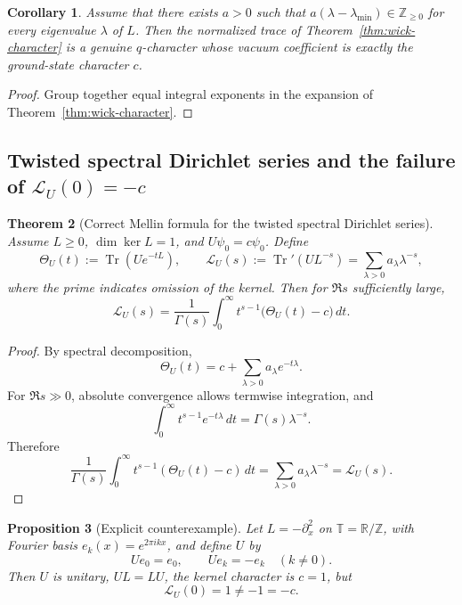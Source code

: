 \documentclass[11pt,a4paper]{article}
\numberwithin{equation}{section}
\newtheorem{theorem}{Theorem}[section]
\newtheorem{proposition}[theorem]{Proposition}
\newtheorem{corollary}[theorem]{Corollary}
\theoremstyle{definition}
\theoremstyle{remark}
\newcommand{\ZZ}{\mathbb Z}
\newcommand{\RR}{\mathbb R}
\begin{document}
\begin{corollary}\label{cor:genuine-q-character}
Assume that there exists $a>0$ such that $a(\lambda-\lambda_{\min})\in\ZZ_{\ge 0}$ for every eigenvalue $\lambda$ of $L$.  Then the normalized trace of Theorem~\ref{thm:wick-character} is a genuine $q$-character whose vacuum coefficient is exactly the ground-state character $c$.
\end{corollary}

\begin{proof}
Group together equal integral exponents in the expansion of Theorem~\ref{thm:wick-character}.
\end{proof}

\subsection{Twisted spectral Dirichlet series and the failure of $\mathcal L_U(0)=-c$}

\begin{theorem}[Correct Mellin formula for the twisted spectral Dirichlet series]\label{thm:twisted-mellin}
Assume $L\ge 0$, $\dim\ker L=1$, and $U\psi_0=c\psi_0$.  Define
\[
\Theta_U(t):=\operatorname{Tr}(Ue^{-tL}),
\qquad
\mathcal L_U(s):=\operatorname{Tr}'(UL^{-s})=\sum_{\lambda>0} a_\lambda\lambda^{-s},
\]
where the prime indicates omission of the kernel.  Then for $\Re s$ sufficiently large,
\[
\mathcal L_U(s)=\frac{1}{\Gamma(s)}\int_0^\infty t^{s-1}\bigl(\Theta_U(t)-c\bigr)\,dt.
\]
\end{theorem}

\begin{proof}
By spectral decomposition,
\[
\Theta_U(t)=c+\sum_{\lambda>0} a_\lambda e^{-t\lambda}.
\]
For $\Re s\gg 0$, absolute convergence allows termwise integration, and
\[
\int_0^\infty t^{s-1}e^{-t\lambda}\,dt=\Gamma(s)\lambda^{-s}.
\]
Therefore
\[
\frac{1}{\Gamma(s)}\int_0^\infty t^{s-1}(\Theta_U(t)-c)\,dt
=\sum_{\lambda>0} a_\lambda\lambda^{-s}
=\mathcal L_U(s).
\]
\end{proof}

\begin{proposition}[Explicit counterexample]\label{prop:counterexample-L0}
Let $L=-\partial_x^2$ on $\mathbb T=\RR/\ZZ$, with Fourier basis $e_k(x)=e^{2\pi ikx}$, and define $U$ by
\[
Ue_0=e_0,
\qquad
Ue_k=-e_k\quad (k\ne 0).
\]
Then $U$ is unitary, $UL=LU$, the kernel character is $c=1$, but
\[
\mathcal L_U(0)=1\neq -1=-c.
\]
\end{proposition}
\end{document}
